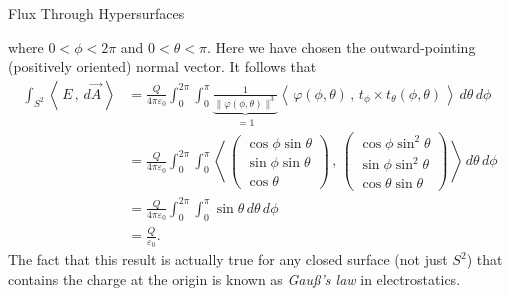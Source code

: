 \documentclass[smaller,hyperref={CJKbookmarks=true}]{beamer}
\newcommand{\scp}[2]{\left\langle\,#1\,,\,#2\,\right\rangle} \newcommand{\scpp}{\langle\,\cdot\,,\,\cdot\,\rangle}
\begin{document}
\begin{frame}{Flux Through Hypersurfaces}
\begin{spacing}{1}
where $0<\phi<2\pi$ and $0<\theta<\pi$. Here we have chosen the outward-pointing (positively oriented) normal vector.
\newpage
It follows that
\begin{equation*}
  \begin{split}
     \int_{S^2}\scp{E}{d\vec{A}} &=\frac{Q}{4\pi\varepsilon_0}\int_{0}^{2\pi}
     \int_{0}^{\pi}\underbrace{\frac{1}{\|\varphi(\phi,\theta)\|^3}}_{=1}
     \scp{\varphi(\phi,\theta)}{t_\phi\times t_\theta(\phi,\theta)}\,d\theta\,d\phi \\
       &=\frac{Q}{4\pi\varepsilon_0}\int_{0}^{2\pi}
       \int_{0}^{\pi}\scp{\begin{pmatrix}
                            \cos\phi\sin\theta \\
                            \sin\phi\sin\theta \\
                            \cos\theta
                          \end{pmatrix}}{\begin{pmatrix}
                            \cos\phi\sin^2\theta \\
                            \sin\phi\sin^2\theta \\
                            \cos\theta\sin\theta
                          \end{pmatrix}}\,d\theta\,d\phi  \\
       &=\frac{Q}{4\pi\varepsilon_0}\int_{0}^{2\pi}\int_{0}^{\pi}\sin\theta\,d\theta\,d\phi  \\
       &=\frac{Q}{\varepsilon_0}.
  \end{split}
\end{equation*}
The fact that this result is actually true for any closed surface (not just
$S^2$) that contains the charge at the origin is known as \emph{Gau\ss 's law} in
electrostatics.
\end{spacing}
\end{frame}
\end{document}
